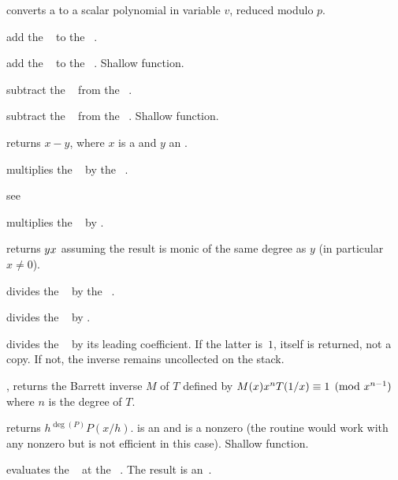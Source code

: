  converts a  to a scalar
polynomial in variable $v$, reduced modulo $p$.

 add the ~ to the
~.

 add the ~
to the ~. Shallow function.

 subtract the ~ from
the ~.

 subtract the
~ from the ~. Shallow function.

 returns $x - y$, where $x$ is
a  and $y$ an .

 multiplies the ~
by the ~.

 see 

 multiplies the ~
by .

 returns $y\*x$ assuming the
result is monic of the same degree as $y$ (in particular $x\neq 0$).

 divides the ~
by the ~.

 divides the ~
by .


 divides the ~ by its
leading coefficient. If the latter is~$1$,  itself is returned, not a
copy. If not, the inverse remains uncollected on the stack.

, returns the Barrett inverse
$M$ of $T$ defined by $M(x)\*x^n\*T(1/x)\equiv 1\pmod{x^{n-1}}$ where $n$ is
the degree of $T$.

 returns $h^{\deg(P)} P(x/h)$.
 is an  and  is a nonzero  (the routine would
work with any nonzero  but is not efficient in this case).
Shallow function.

 evaluates the ~
at the ~. The result is an~.

